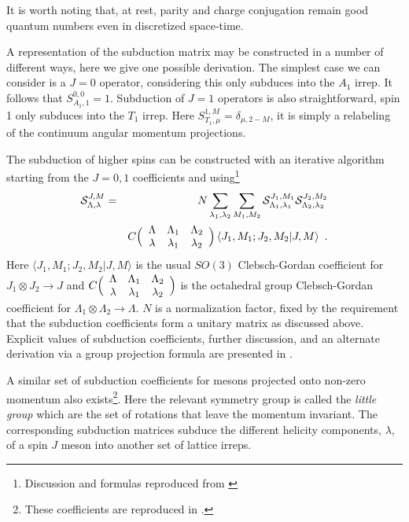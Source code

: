  It is worth noting that, at rest, parity and charge conjugation remain good quantum numbers even in discretized space-time.
 
 A representation of the subduction matrix may be constructed in a number of different ways, here we give one possible derivation. The simplest case we can consider is a $J=0$ operator, considering  this only subduces into the $A_1$ irrep. It follows that $S^{0,0}_{A_1,1} = 1$. Subduction of $J=1$ operators is also straightforward, spin 1 only subduces into the $T_1$ irrep. Here $S^{1,M}_{T_1,\mu} = \delta_{\mu,2-M}$, it is simply a relabeling of the continuum angular momentum projections. 
 
 The subduction of higher spins can be constructed with an iterative algorithm starting from the $J=0,1$ coefficients and using\footnote{Discussion and formulas reproduced from \cite{Dudek:2010wm}}
\begin{eqnarray}
\mathcal{S}^{J,M}_{\Lambda, \lambda} &=& N \sum_{\lambda_1, \lambda_2} \sum_{M_1, M_2} 
\mathcal{S}^{J_1,M_1}_{\Lambda_1, \lambda_1} \mathcal{S}^{J_2,M_2}_{\Lambda_2, \lambda_2} \nonumber \\
&& C\Bigl( \begin{array}{ccc}\Lambda & \Lambda_1 & \Lambda_2 \\ \lambda & \lambda_1 & \lambda_2\end{array} \Bigr) 
\left<J_1, M_1; J_2, M_2 | J, M \right>  ~ . \nonumber
\label{Equ:SubductionIteration}
\end{eqnarray}
Here $\langle J_1, M_1; J_2, M_2 | J, M \rangle$ is the usual $SO(3)$ Clebsch-Gordan coefficient for $J_1 \otimes J_2 \rightarrow J$ and $C\Bigl( \begin{array}{ccc}\Lambda & \Lambda_1 & \Lambda_2 \\ \lambda & \lambda_1 & \lambda_2\end{array} \Bigr)$ is the octahedral group Clebsch-Gordan coefficient for $\Lambda_1 \otimes \Lambda_2 \rightarrow \Lambda$.  $N$ is a normalization factor, fixed by the requirement that the subduction coefficients form a unitary matrix as discussed above. Explicit values of subduction coefficients, further discussion, and an alternate derivation via a group projection formula are presented in \cite{Dudek:2010wm}. 

A similar set of subduction coefficients for mesons projected onto non-zero momentum also exists\footnote{These coefficients are reproduced in .}. Here the relevant symmetry group is called the \emph{little group} which are the set of rotations that leave the momentum invariant. The corresponding subduction matrices subduce the different helicity components, $\lambda$, of a spin $J$ meson into another set of lattice irreps. 
 
